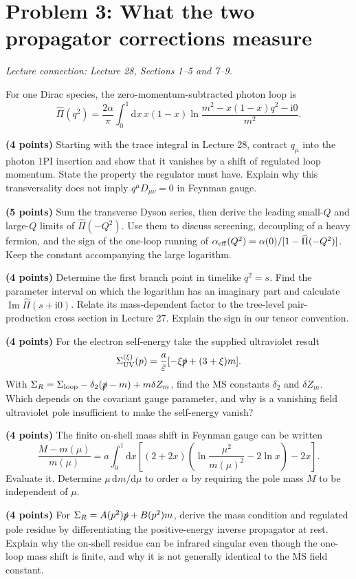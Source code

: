 \documentclass[11pt]{article}
\newcommand{\dd}{\mathrm d}
\newcommand{\ii}{\mathrm i}
\newcommand{\eps}{\varepsilon}
\newcommand{\MSbar}{\overline{\mathrm{MS}}}
\newcommand{\problem}[2]{\clearpage\section*{\color{qftblue}Problem #1: #2}}
\newcommand{\connection}[1]{{\small\textit{Lecture connection: #1}\par}\medskip}
\begin{document}
\problem{3}{What the two propagator corrections measure}
\connection{Lecture 28, Sections 1--5 and 7--9.}
For one Dirac species, the zero-momentum-subtracted photon loop is
\[
 \widehat\Pi(q^2)=\frac{2\alpha}{\pi}\int_0^1\dd x\,x(1-x)
 \ln\frac{m^2-x(1-x)q^2-\ii0}{m^2}.
\]
\begin{parts}
\item \textbf{(4 points)} Starting with the trace integral in Lecture 28,
contract \(q_\mu\) into the photon 1PI insertion and show that it vanishes
by a shift of regulated loop momentum. State the property the regulator
must have. Explain why this transversality does not imply
\(q^\mu D_{\mu\nu}=0\) in Feynman gauge.

\item \textbf{(5 points)} Sum the transverse Dyson series, then derive
the leading small-\(Q\) and large-\(Q\) limits of \(\widehat\Pi(-Q^2)\).
Use them to discuss screening, decoupling of a heavy fermion, and the
sign of the one-loop running of
\(\alpha_{\rm eff}(Q^2)=\alpha(0)/[1-\widehat\Pi(-Q^2)]\).
Keep the constant accompanying the large logarithm.

\item \textbf{(4 points)} Determine the first branch point in timelike
\(q^2=s\). Find the parameter interval on which the logarithm has an
imaginary part and calculate \(\operatorname{Im}\widehat\Pi(s+\ii0)\).
Relate its mass-dependent factor to the tree-level pair-production
cross section in Lecture 27. Explain the sign in our tensor convention.

\item \textbf{(4 points)} For the electron self-energy take the supplied
ultraviolet result
\[
 \Sigma_{\rm UV}^{(\xi)}(p)
 =\frac{a}{\bar\eps}[-\xi\slashed p+(3+\xi)m].
\]
With \(\Sigma_R=\Sigma_{\rm loop}-\delta_2(\slashed p-m)+m\delta Z_m\),
find the \(\MSbar\) constants \(\delta_2\) and \(\delta Z_m\).
Which depends on the covariant gauge parameter, and why is a vanishing
field ultraviolet pole insufficient to make the self-energy vanish?

\item \textbf{(4 points)} The finite on-shell mass shift in Feynman gauge
can be written
\[
 \frac{M-m(\mu)}{m(\mu)}
 =a\int_0^1\dd x\left[(2+2x)
 \left(\ln\frac{\mu^2}{m(\mu)^2}-2\ln x\right)-2x\right].
\]
Evaluate it. Determine \(\mu\,\dd m/\dd\mu\) to order \(\alpha\) by
requiring the pole mass \(M\) to be independent of \(\mu\).

\item \textbf{(4 points)} For
\(\Sigma_R=A(p^2)\slashed p+B(p^2)m\), derive the mass condition and
regulated pole residue by differentiating the positive-energy inverse
propagator at rest. Explain why the on-shell residue can be infrared
singular even though the one-loop mass shift is finite, and why it is
not generally identical to the \(\MSbar\) field constant.
\end{parts}
\end{document}
